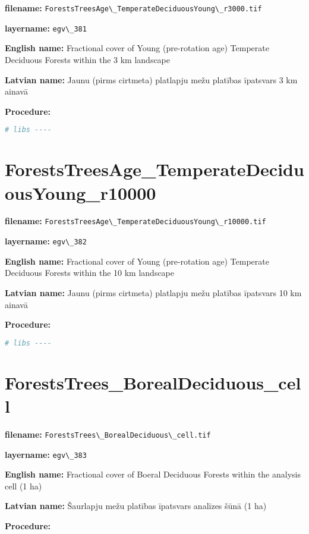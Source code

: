 \documentclass[
]{book}
\newcommand{\passthrough}[1]{#1}
\begin{document}
\textbf{filename:} \passthrough{\lstinline!ForestsTreesAge\_TemperateDeciduousYoung\_r3000.tif!}

\textbf{layername:} \passthrough{\lstinline!egv\_381!}

\textbf{English name:} Fractional cover of Young (pre-rotation age) Temperate Deciduous Forests within the 3 km landscape

\textbf{Latvian name:} Jaunu (pirms cirtmeta) platlapju mežu platības īpatsvars 3 km ainavā

\textbf{Procedure:}

\begin{lstlisting}[language=R]
# libs ----
\end{lstlisting}

\section{ForestsTreesAge\_TemperateDeciduousYoung\_r10000}\label{ch06.382}

\textbf{filename:} \passthrough{\lstinline!ForestsTreesAge\_TemperateDeciduousYoung\_r10000.tif!}

\textbf{layername:} \passthrough{\lstinline!egv\_382!}

\textbf{English name:} Fractional cover of Young (pre-rotation age) Temperate Deciduous Forests within the 10 km landscape

\textbf{Latvian name:} Jaunu (pirms cirtmeta) platlapju mežu platības īpatsvars 10 km ainavā

\textbf{Procedure:}

\begin{lstlisting}[language=R]
# libs ----
\end{lstlisting}

\section{ForestsTrees\_BorealDeciduous\_cell}\label{ch06.383}

\textbf{filename:} \passthrough{\lstinline!ForestsTrees\_BorealDeciduous\_cell.tif!}

\textbf{layername:} \passthrough{\lstinline!egv\_383!}

\textbf{English name:} Fractional cover of Boeral Deciduous Forests within the analysis cell (1 ha)

\textbf{Latvian name:} Šaurlapju mežu platības īpatsvars analīzes šūnā (1 ha)

\textbf{Procedure:}
\end{document}
